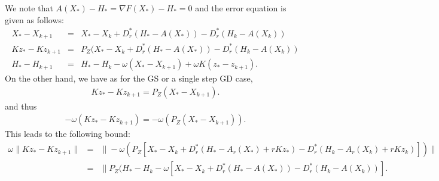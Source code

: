 We note that $A(X_*) - H_* = \nabla F(X_*) - H_* = 0$ and the 
error equation is given as follows:  
\begin{eqnarray*}
X_{*} - X_{k+1} &=& X_* - X_{k} + D_r^*(H_* - A(X_*)) - D_r^* (H_k - A(X_k)) \\ 
Kz_* - Kz_{k+1} &=& P_Z (X_{*} - X_{k} + D_r^*(H_* - A(X_*)) - D_r^* (H_k - A(X_k)) \\ 
H_* - H_{k+1} &=& H_* - H_k - \omega (X_* - X_{k+1}) + \omega K(z_* - z_{k+1}). 
\end{eqnarray*}
On the other hand, we have as for the GS or a single step GD case,
\begin{eqnarray*}
Kz_{*} - Kz_{k+1} = P_Z \left ( X_* - X_{k+1} \right ). 
\end{eqnarray*}
and thus
\begin{eqnarray*}
-\omega \left ( Kz_{*} - Kz_{k+1} \right ) = -\omega \left ( P_Z \left ( X_* - X_{k+1} \right ) \right ). 
\end{eqnarray*}
This leads to the following bound:  
\begin{eqnarray*}
\omega \|Kz_{*} - Kz_{k+1}\| &=& \|-\omega \left ( P_Z [X_* - X_k + D_r^{*} (H_* - A_r(X_*) + rKz_*) - D_r^* (H_k - A_r(X_k) + rKz_k)] \right ) \| \\
&=& \|P_Z (H_* - H_k - \omega [X_* - X_k + D_r^* (H_* - A(X_*)) - D_r^* (H_k - A(X_k))].
%
\end{eqnarray*}
